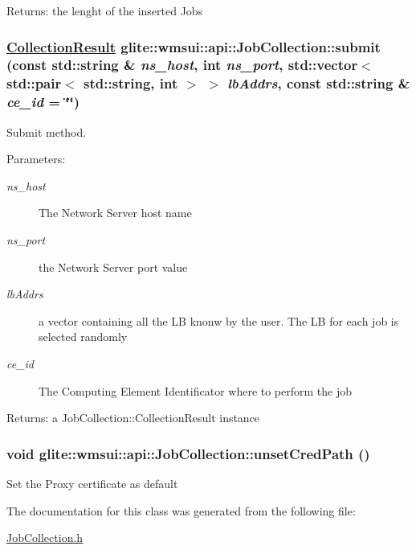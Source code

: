 \begin{Desc}
\item[Returns:]the lenght of the inserted Jobs \end{Desc}
\hypertarget{classglite_1_1wmsui_1_1api_1_1JobCollection_z7_0}{
\subsubsection[submit]{\setlength{\rightskip}{0pt plus 5cm}\hyperlink{structglite_1_1wmsui_1_1api_1_1CollectionResult}{Collection\-Result} glite::wmsui::api::Job\-Collection::submit (const std::string \& {\em ns\_\-host}, int {\em ns\_\-port}, std::vector$<$ std::pair$<$ std::string, int $>$ $>$ {\em lb\-Addrs}, const std::string \& {\em ce\_\-id} = \char`\"{}\char`\"{})}}
\label{classglite_1_1wmsui_1_1api_1_1JobCollection_z7_0}


Submit method. \begin{Desc}
\item[Parameters:]
\begin{description}
\item[{\em ns\_\-host}]The Network Server host name \item[{\em ns\_\-port}]the Network Server port value \item[{\em lb\-Addrs}]a vector containing all the LB knonw by the user. The LB for each job is selected randomly \item[{\em ce\_\-id}]The Computing Element Identificator where to perform the job \end{description}
\end{Desc}
\begin{Desc}
\item[Returns:]a Job\-Collection::Collection\-Result instance \end{Desc}
\hypertarget{classglite_1_1wmsui_1_1api_1_1JobCollection_z3_7}{
\subsubsection[unsetCredPath]{\setlength{\rightskip}{0pt plus 5cm}void glite::wmsui::api::Job\-Collection::unset\-Cred\-Path ()}}
\label{classglite_1_1wmsui_1_1api_1_1JobCollection_z3_7}


Set the Proxy certificate as default 

The documentation for this class was generated from the following file:\begin{CompactItemize}
\item 
\hyperlink{JobCollection_8h}{Job\-Collection.h}\end{CompactItemize}
